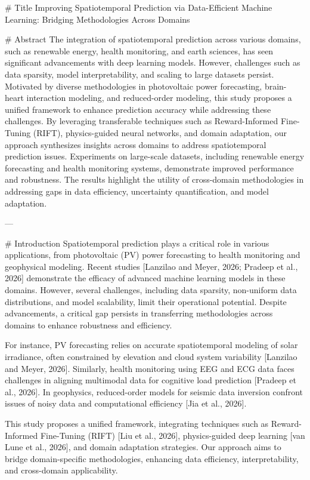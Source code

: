 # Title  
Improving Spatiotemporal Prediction via Data-Efficient Machine Learning: Bridging Methodologies Across Domains  

# Abstract  
The integration of spatiotemporal prediction across various domains, such as renewable energy, health monitoring, and earth sciences, has seen significant advancements with deep learning models. However, challenges such as data sparsity, model interpretability, and scaling to large datasets persist. Motivated by diverse methodologies in photovoltaic power forecasting, brain-heart interaction modeling, and reduced-order modeling, this study proposes a unified framework to enhance prediction accuracy while addressing these challenges. By leveraging transferable techniques such as Reward-Informed Fine-Tuning (RIFT), physics-guided neural networks, and domain adaptation, our approach synthesizes insights across domains to address spatiotemporal prediction issues. Experiments on large-scale datasets, including renewable energy forecasting and health monitoring systems, demonstrate improved performance and robustness. The results highlight the utility of cross-domain methodologies in addressing gaps in data efficiency, uncertainty quantification, and model adaptation.  

---

# Introduction  
Spatiotemporal prediction plays a critical role in various applications, from photovoltaic (PV) power forecasting to health monitoring and geophysical modeling. Recent studies [Lanzilao and Meyer, 2026; Pradeep et al., 2026] demonstrate the efficacy of advanced machine learning models in these domains. However, several challenges, including data sparsity, non-uniform data distributions, and model scalability, limit their operational potential. Despite advancements, a critical gap persists in transferring methodologies across domains to enhance robustness and efficiency.  

For instance, PV forecasting relies on accurate spatiotemporal modeling of solar irradiance, often constrained by elevation and cloud system variability [Lanzilao and Meyer, 2026]. Similarly, health monitoring using EEG and ECG data faces challenges in aligning multimodal data for cognitive load prediction [Pradeep et al., 2026]. In geophysics, reduced-order models for seismic data inversion confront issues of noisy data and computational efficiency [Jia et al., 2026].  

This study proposes a unified framework, integrating techniques such as Reward-Informed Fine-Tuning (RIFT) [Liu et al., 2026], physics-guided deep learning [van Lune et al., 2026], and domain adaptation strategies. Our approach aims to bridge domain-specific methodologies, enhancing data efficiency, interpretability, and cross-domain applicability.  

